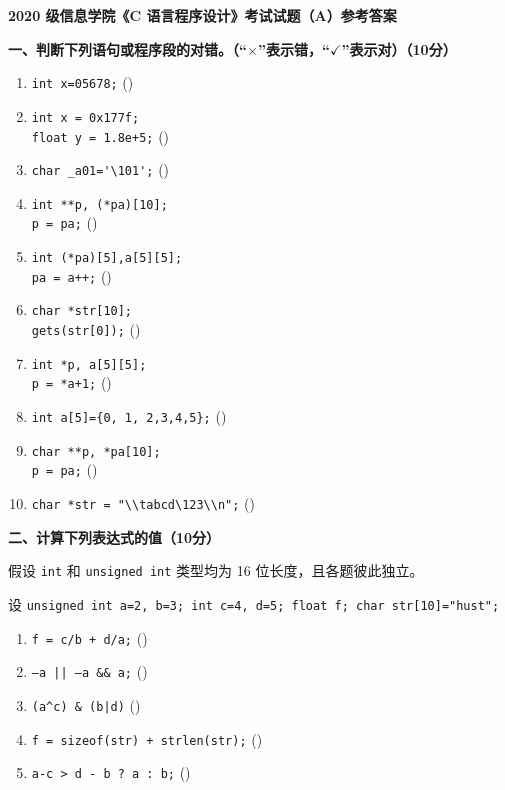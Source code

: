 \documentclass[UTF8,a4paper,10.5pt]{ctexart}
\newcommand{\parenval}[1]{\hfill(\makebox[1.4cm][c]{#1})}
\begin{document}
\begin{center}
    {\Large\bfseries 2020 级信息学院《C 语言程序设计》考试试题（A）参考答案}
\end{center}

\medskip

\noindent\textbf{一、判断下列语句或程序段的对错。（“$\times$”表示错，“$\checkmark$”表示对）（10分）}

\begin{enumerate}[label=(\arabic*), leftmargin=2.2em, itemsep=2pt]
    \item \texttt{int x=05678;} \parenval{$\times$}
    \item \texttt{int x = 0x177f;}\\
          \texttt{float y = 1.8e+5;} \parenval{$\checkmark$}
    \item \lstinline|char _a01='\101';| \parenval{$\checkmark$}
    \item \texttt{int **p, (*pa)[10];}\\
          \texttt{p = pa;} \parenval{$\times$}
    \item \texttt{int (*pa)[5],a[5][5];}\\
          \texttt{pa = a++;} \parenval{$\times$}
    \item \texttt{char *str[10];}\\
          \texttt{gets(str[0]);} \parenval{$\times$}
    \item \texttt{int *p, a[5][5];}\\
          \texttt{p = *a+1;} \parenval{$\checkmark$}
    \item \texttt{int a[5]=\{0, 1, 2,3,4,5\};} \parenval{$\times$}
    \item \texttt{char **p, *pa[10];}\\
          \texttt{p = pa;} \parenval{$\checkmark$}
    \item \lstinline|char *str = "\\tabcd\123\\n";| \parenval{$\checkmark$}
\end{enumerate}

\medskip

\noindent\textbf{二、计算下列表达式的值（10分）}

\noindent 假设 \texttt{int} 和 \texttt{unsigned int} 类型均为 16 位长度，且各题彼此独立。

\noindent 设 \texttt{unsigned int a=2, b=3; int c=4, d=5; float f; char str[10]="hust";}
\begin{enumerate}[label=(\arabic*), leftmargin=2.2em, itemsep=2pt]
    \item \texttt{f = c/b + d/a;} \parenval{\texttt{3.0}}
    \item \texttt{--a || --a \&\& a;} \parenval{\texttt{1}}
    \item \texttt{(a\^{}c) \& (b|d)} \parenval{\texttt{6}}
    \item \texttt{f = sizeof(str) + strlen(str);} \parenval{\texttt{14.0}}
    \item \texttt{a-c > d - b ? a : b;} \parenval{\texttt{2}}
\end{enumerate}
\end{document}
